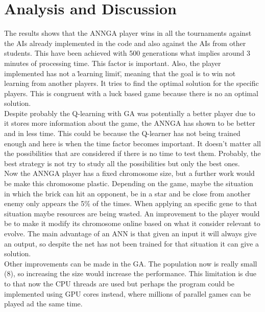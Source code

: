 \section{Analysis and Discussion} %
\label{sec:analysis_and_discussion}
The results shows that the ANNGA player wins in all the tournaments against the AIs already implemented in the code and also against the AIs from other students. 
This have been achieved with 500 generations what implies around 3 minutes of processing time.
This factor is important.
Also, the player implemented has not a \"learning limit\", meaning that the goal is to win not learning from another players.
It tries to find the optimal solution for the specific players.
This is congruent with a luck based game because there is no an optimal solution. \\

Despite probably the Q-learning with GA was potentially a better player due to it stores more information about the game, the ANNGA has shown to be better and in less time.
This could be because the Q-learner has not being trained enough and here is when the time factor becomes important.
It doesn't matter all the possibilities that are considered if there is no time to test them.
Probably, the best strategy is not try to study all the possibilities but only the best ones.\\

Now the ANNGA player has a fixed chromosome size, but a further work would be make this chromosome plastic.
Depending on the game, maybe the situation in which the brick can hit an opponent, be in a star and be close from another enemy only appears the 5\% of the times.
When applying an specific gene to that situation maybe resources are being wasted.
An improvement to the player would be to make it modify its chromosome online based on what it consider relevant to evolve.
The main advantage of an ANN is that given an input it will always give an output, so despite the net has not been trained for that situation it can give a solution.\\

Other improvements can be made in the GA.
The population now is really small (8), so increasing the size would increase the performance.
This limitation is due to that now the CPU threads are used but perhaps the program could be implemented using GPU cores instead, where millions of parallel games can be played ad the same time.

